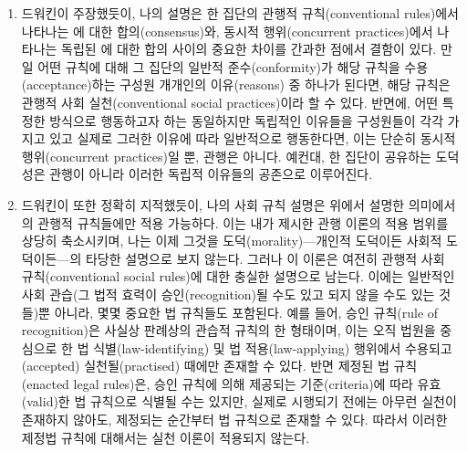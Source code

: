 \begin{enumerate}
\def\labelenumi{(\roman{enumi})}
\item
  드워킨이 주장했듯이, 나의 설명은 한 집단의 관행적 규칙(conventional
  rules)에서 나타나는 에 대한 합의(consensus)와,
  동시적 행위(concurrent practices)에서 나타나는 독립된
  에 대한 합의 사이의 중요한 차이를 간과한 점에서
  결함이 있다. 만일 어떤 규칙에 대해 그 집단의 일반적 준수(conformity)가
  해당 규칙을 수용(acceptance)하는 구성원 개개인의 이유(reasons) 중
  하나가 된다면, 해당 규칙은 관행적 사회 실천(conventional social
  practices)이라 할 수 있다. 반면에, 어떤 특정한 방식으로 행동하고자
  하는 동일하지만 독립적인 이유들을 구성원들이 각각 가지고 있고 실제로
  그러한 이유에 따라 일반적으로 행동한다면, 이는 단순히 동시적
  행위(concurrent practices)일 뿐, 관행은 아니다. 예컨대, 한 집단이
  공유하는 도덕성은 관행이 아니라 이러한 독립적 이유들의 공존으로
  이루어진다.
\item
  드워킨이 또한 정확히 지적했듯이, 나의 사회 규칙 설명은 위에서 설명한
  의미에서의 관행적 규칙들에만 적용 가능하다. 이는 내가 제시한 관행
  이론의 적용 범위를 상당히 축소시키며, 나는 이제 그것을
  도덕(morality)---개인적 도덕이든 사회적 도덕이든---의 타당한 설명으로
  보지 않는다. 그러나 이 이론은 여전히 관행적 사회 규칙(conventional
  social rules)에 대한 충실한 설명으로 남는다. 이에는 일반적인 사회
  관습(그 법적 효력이 승인(recognition)될 수도 있고 되지 않을 수도 있는
  것들)뿐 아니라, 몇몇 중요한 법 규칙들도 포함된다. 예를 들어, 승인
  규칙(rule of recognition)은 사실상 판례상의 관습적 규칙의 한 형태이며,
  이는 오직 법원을 중심으로 한 법 식별(law-identifying) 및 법
  적용(law-applying) 행위에서 수용되고(accepted) 실천될(practised)
  때에만 존재할 수 있다. 반면 제정된 법 규칙(enacted legal rules)은,
  승인 규칙에 의해 제공되는 기준(criteria)에 따라 유효(valid)한 법
  규칙으로 식별될 수는 있지만, 실제로 시행되기 전에는 아무런 실천이
  존재하지 않아도, 제정되는 순간부터 법 규칙으로 존재할 수 있다. 따라서
  이러한 제정법 규칙에 대해서는 실천 이론이 적용되지 않는다.
\end{enumerate}

